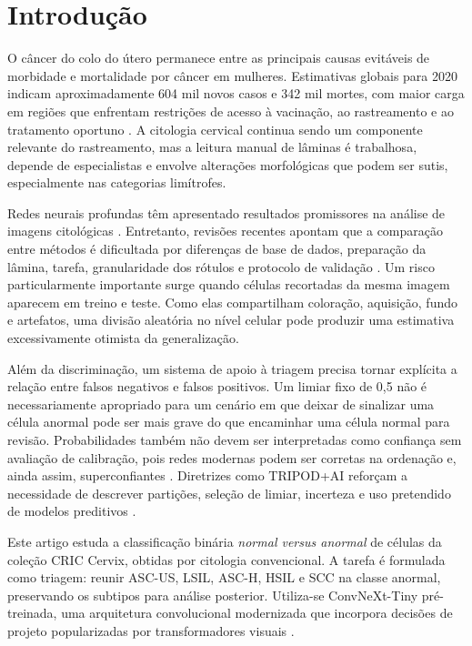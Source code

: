 \section{Introdução}

O câncer do colo do útero permanece entre as principais causas evitáveis de
morbidade e mortalidade por câncer em mulheres. Estimativas globais para 2020
indicam aproximadamente 604 mil novos casos e 342 mil mortes, com maior carga
em regiões que enfrentam restrições de acesso à vacinação, ao rastreamento e ao
tratamento oportuno \cite{singh2023global}. A citologia cervical continua sendo
um componente relevante do rastreamento, mas a leitura manual de lâminas é
trabalhosa, depende de especialistas e envolve alterações morfológicas que
podem ser sutis, especialmente nas categorias limítrofes.

Redes neurais profundas têm apresentado resultados promissores na análise de
imagens citológicas \cite{jiang2023systematic,xu2023cervical}. Entretanto,
revisões recentes apontam que a comparação
entre métodos é dificultada por diferenças de base de dados, preparação da
lâmina, tarefa, granularidade dos rótulos e protocolo de validação
\cite{fang2024systematic}. Um risco particularmente
importante surge quando células recortadas da mesma imagem aparecem em treino
e teste. Como elas compartilham coloração, aquisição, fundo e artefatos, uma
divisão aleatória no nível celular pode produzir uma estimativa excessivamente
otimista da generalização.

Além da discriminação, um sistema de apoio à triagem precisa tornar explícita a
relação entre falsos negativos e falsos positivos. Um limiar fixo de 0,5 não é
necessariamente apropriado para um cenário em que deixar de sinalizar uma
célula anormal pode ser mais grave do que encaminhar uma célula normal para
revisão. Probabilidades também não devem ser interpretadas como confiança sem
avaliação de calibração, pois redes modernas podem ser corretas na ordenação e,
ainda assim, superconfiantes \cite{guo2017calibration}. Diretrizes como
TRIPOD+AI reforçam a necessidade de descrever partições, seleção de limiar,
incerteza e uso pretendido de modelos preditivos \cite{collins2024tripod}.

Este artigo estuda a classificação binária \emph{normal versus anormal} de
células da coleção CRIC Cervix, obtidas por citologia convencional. A tarefa é
formulada como triagem: reunir ASC-US, LSIL, ASC-H, HSIL e SCC na classe
anormal, preservando os subtipos para análise posterior. Utiliza-se
ConvNeXt-Tiny pré-treinada, uma arquitetura convolucional modernizada que
incorpora decisões de projeto popularizadas por transformadores visuais
\cite{liu2022convnext}.

